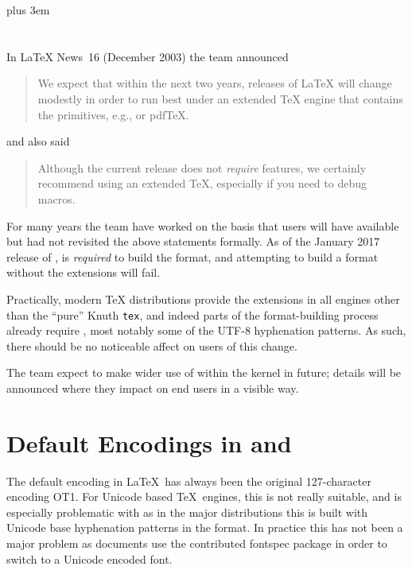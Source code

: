 \documentclass{ltnews}
\begin{document}
\maketitle
\tableofcontents

\rightskip=0pt plus 3em
\section{\eTeX{}}

In \LaTeX{} News~16 (December 2003) the team announced
\begin{quotation}
We expect that within the next two years, releases of \LaTeX{} will
change modestly in order to run best under an extended \TeX{} engine
that contains the \eTeX{} primitives, e.g., \eTeX{} or pdf\TeX{}.
\end{quotation}
and also said
\begin{quotation}
Although the current release does not \emph{require} \eTeX{} features, we
certainly recommend using an extended \TeX{}, especially if you need to debug
macros.
\end{quotation}

For many years the team have worked on the basis that users will have \eTeX{}
available but had not revisited the above statements formally. As of the
January 2017 release of \LaTeXe{}, \eTeX{} is \emph{required} to build the
format, and attempting to build a format without the extensions will fail.

Practically, modern \TeX{} distributions provide the extensions in all engines
other than the ``pure'' Knuth \texttt{tex}, and indeed parts of the
format-building process already require \eTeX{}, most notably some of the UTF-8
hyphenation patterns. As such, there should be no noticeable affect on users of
this change.

The team expect to make wider use of \eTeX{} within the kernel in future;
details will be announced where they impact on end users in a visible way.

\section{Default Encodings in  and }
The default encoding in \LaTeX\ has always been the original
127-character encoding OT1.  For Unicode based \TeX\ engines, this
is not really suitable, and is especially problematic with
 as in the major distributions this is built with
Unicode base hyphenation patterns in the format.  In practice this has
not been a major problem as documents use the contributed
\textsf{fontspec} package in order to switch to a
Unicode encoded font.
\end{document}
